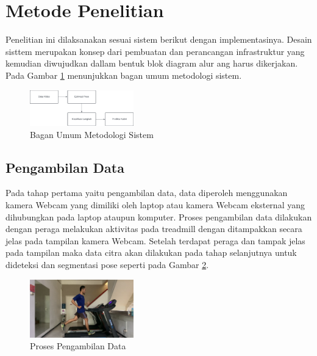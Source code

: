 \section{Metode Penelitian}
\label{sec:MetodePenelitian}

Penelitian ini dilaksanakan sesuai sistem berikut dengan implementasinya. Desain sisttem merupakan konsep dari pembuatan dan perancangan infrastruktur yang kemudian diwujudkan dallam bentuk blok diagram alur ang harus dikerjakan. Pada Gambar \ref{fig:BlokMetodologi} menunjukkan bagan umum metodologi sistem.

\begin{figure} [ht]
  \centering
  \includegraphics[width=0.4\textwidth]{gambar/blok diagram metodologi4.png}
  \caption{Bagan Umum Metodologi Sistem}
  \label{fig:BlokMetodologi}
\end{figure}

\subsection{Pengambilan Data}
\label{subsec:PengambilanData}

Pada tahap pertama yaitu pengambilan data, data diperoleh menggunakan kamera Webcam yang dimiliki oleh laptop atau kamera Webcam eksternal yang dihubungkan pada laptop ataupun komputer. Proses pengambilan data dilakukan dengan peraga melakukan aktivitas pada treadmill dengan ditampakkan secara jelas pada tampilan kamera Webcam. Setelah terdapat peraga dan tampak jelas pada tampilan maka data citra akan dilakukan pada tahap selanjutnya untuk dideteksi dan segmentasi pose seperti pada Gambar \ref{fig:PengambilanData}.

\begin{figure} [ht]
  \centering
  \includegraphics[width=0.4\textwidth]{gambar/pengambilan data.png}
  \caption{Proses Pengambilan Data}
  \label{fig:PengambilanData}
\end{figure}

